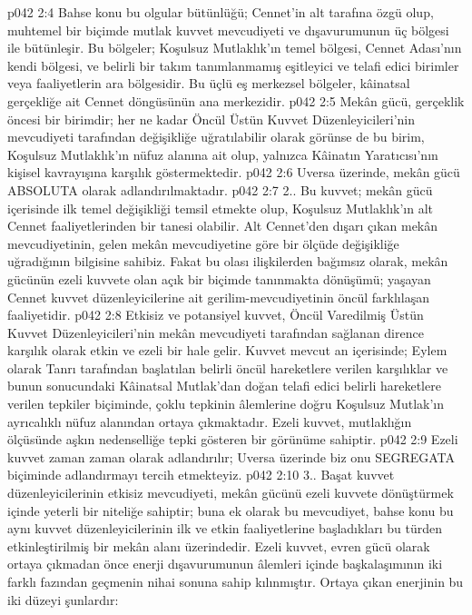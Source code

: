 \vs p042 2:4 Bahse konu bu olgular bütünlüğü; Cennet’in alt tarafına özgü olup, muhtemel bir biçimde mutlak kuvvet mevcudiyeti ve dışavurumunun üç bölgesi ile bütünleşir. Bu bölgeler; Koşulsuz Mutlaklık’ın temel bölgesi, Cennet Adası’nın kendi bölgesi, ve belirli bir takım tanımlanmamış eşitleyici ve telafi edici birimler veya faaliyetlerin ara bölgesidir. Bu üçlü eş merkezsel bölgeler, kâinatsal gerçekliğe ait Cennet döngüsünün ana merkezidir.
\vs p042 2:5 Mekân gücü, gerçeklik öncesi bir birimdir; her ne kadar Öncül Üstün Kuvvet Düzenleyicileri’nin mevcudiyeti tarafından değişikliğe uğratılabilir olarak görünse de bu birim, Koşulsuz Mutlaklık’ın nüfuz alanına ait olup, yalnızca Kâinatın Yaratıcısı’nın kişisel kavrayışına karşılık göstermektedir.
\vs p042 2:6 Uversa üzerinde, mekân gücü ABSOLUTA olarak adlandırılmaktadır.
\vs p042 2:7 2.\bibnobreakspace {}. Bu kuvvet; mekân gücü içerisinde ilk temel değişikliği temsil etmekte olup, Koşulsuz Mutlaklık’ın alt Cennet faaliyetlerinden bir tanesi olabilir. Alt Cennet’den dışarı çıkan mekân mevcudiyetinin, gelen mekân mevcudiyetine göre bir ölçüde değişikliğe uğradığının bilgisine sahibiz. Fakat bu olası ilişkilerden bağımsız olarak, mekân gücünün ezeli kuvvete olan açık bir biçimde tanınmakta dönüşümü; yaşayan Cennet kuvvet düzenleyicilerine ait gerilim\hyp{}mevcudiyetinin öncül farklılaşan faaliyetidir.
\vs p042 2:8 Etkisiz ve potansiyel kuvvet, Öncül Varedilmiş Üstün Kuvvet Düzenleyicileri’nin mekân mevcudiyeti tarafından sağlanan dirence karşılık olarak etkin ve ezeli bir hale gelir. Kuvvet mevcut an içerisinde; Eylem olarak Tanrı tarafından başlatılan belirli öncül hareketlere verilen karşılıklar ve bunun sonucundaki Kâinatsal Mutlak’dan doğan telafi edici belirli hareketlere verilen tepkiler biçiminde, çoklu tepkinin âlemlerine doğru Koşulsuz Mutlak’ın ayrıcalıklı nüfuz alanından ortaya çıkmaktadır. Ezeli kuvvet, mutlaklığın ölçüsünde aşkın nedenselliğe tepki gösteren bir görünüme sahiptir.
\vs p042 2:9 Ezeli kuvvet zaman zaman  olarak adlandırılır; Uversa üzerinde biz onu SEGREGATA biçiminde adlandırmayı tercih etmekteyiz.
\vs p042 2:10 3.. Başat kuvvet düzenleyicilerinin etkisiz mevcudiyeti, mekân gücünü ezeli kuvvete dönüştürmek içinde yeterli bir niteliğe sahiptir; buna ek olarak bu mevcudiyet, bahse konu bu aynı kuvvet düzenleyicilerinin ilk ve etkin faaliyetlerine başladıkları bu türden etkinleştirilmiş bir mekân alanı üzerindedir. Ezeli kuvvet, evren gücü olarak ortaya çıkmadan önce enerji dışavurumunun âlemleri içinde başkalaşımının iki farklı fazından geçmenin nihai sonuna sahip kılınmıştır. Ortaya çıkan enerjinin bu iki düzeyi şunlardır:
